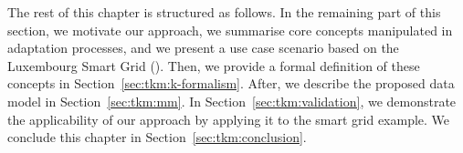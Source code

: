 The rest of this chapter is structured as follows.
In the remaining part of this section, we motivate our approach, we summarise core concepts manipulated in adaptation processes, and we present a use case scenario based on the Luxembourg Smart Grid (\cf {}).
Then, we provide a formal definition of these concepts in Section~\ref{sec:tkm:k-formalism}.
After, we describe the proposed data model in Section~\ref{sec:tkm:mm}.
In Section~\ref{sec:tkm:validation}, we demonstrate the applicability of our approach by applying it to the smart grid example.
We conclude this chapter in Section~\ref{sec:tkm:conclusion}.









